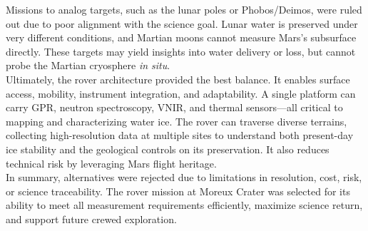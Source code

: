 Missions to analog targets, such as the lunar poles or Phobos/Deimos, were ruled out due to poor alignment with the science goal. Lunar water is preserved under very different conditions, and Martian moons cannot measure Mars’s subsurface directly. These targets may yield insights into water delivery or loss, but cannot probe the Martian cryosphere \textit{in situ}.\\

Ultimately, the rover architecture provided the best balance. It enables surface access, mobility, instrument integration, and adaptability. A single platform can carry GPR, neutron spectroscopy, VNIR, and thermal sensors—all critical to mapping and characterizing water ice. The rover can traverse diverse terrains, collecting high-resolution data at multiple sites to understand both present-day ice stability and the geological controls on its preservation. It also reduces technical risk by leveraging Mars flight heritage.\\

In summary, alternatives were rejected due to limitations in resolution, cost, risk, or science traceability. The rover mission at Moreux Crater was selected for its ability to meet all measurement requirements efficiently, maximize science return, and support future crewed exploration.